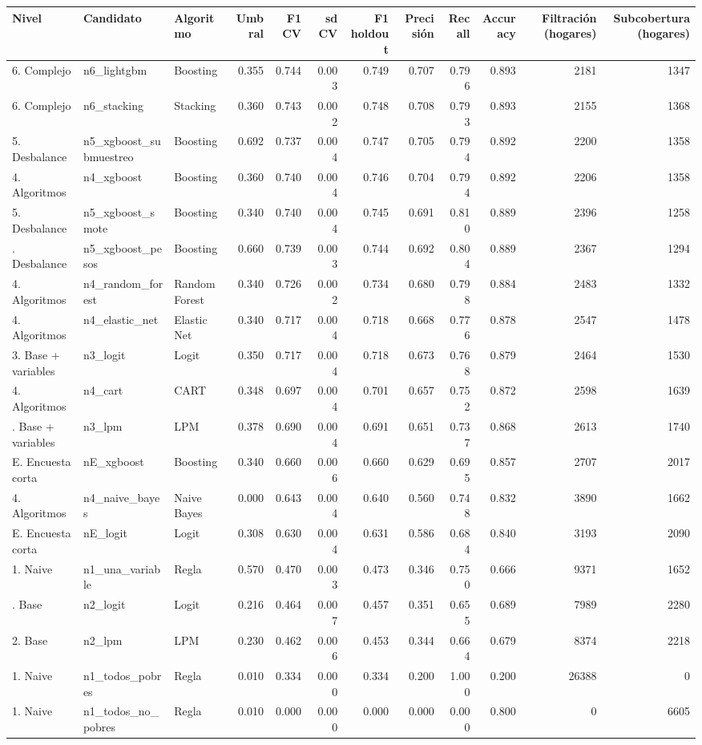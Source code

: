 
\begin{tabular}{lllrrrrrrrrr}
\toprule
Nivel & Candidato & Algoritmo & Umbral & F1 CV & sd CV & F1 holdout & Precisión & Recall & Accuracy & Filtración (hogares) & Subcobertura (hogares)\\
\midrule
6. Complejo & n6\_lightgbm & Boosting & 0.355 & 0.744 & 0.003 & 0.749 & 0.707 & 0.796 & 0.893 & 2181 & 1347\\
6. Complejo & n6\_stacking & Stacking & 0.360 & 0.743 & 0.002 & 0.748 & 0.708 & 0.793 & 0.893 & 2155 & 1368\\
5. Desbalance & n5\_xgboost\_submuestreo & Boosting & 0.692 & 0.737 & 0.004 & 0.747 & 0.705 & 0.794 & 0.892 & 2200 & 1358\\
4. Algoritmos & n4\_xgboost & Boosting & 0.360 & 0.740 & 0.004 & 0.746 & 0.704 & 0.794 & 0.892 & 2206 & 1358\\
5. Desbalance & n5\_xgboost\_smote & Boosting & 0.340 & 0.740 & 0.004 & 0.745 & 0.691 & 0.810 & 0.889 & 2396 & 1258\\
\addlinespace
5. Desbalance & n5\_xgboost\_pesos & Boosting & 0.660 & 0.739 & 0.003 & 0.744 & 0.692 & 0.804 & 0.889 & 2367 & 1294\\
4. Algoritmos & n4\_random\_forest & Random Forest & 0.340 & 0.726 & 0.002 & 0.734 & 0.680 & 0.798 & 0.884 & 2483 & 1332\\
4. Algoritmos & n4\_elastic\_net & Elastic Net & 0.340 & 0.717 & 0.004 & 0.718 & 0.668 & 0.776 & 0.878 & 2547 & 1478\\
3. Base + variables & n3\_logit & Logit & 0.350 & 0.717 & 0.004 & 0.718 & 0.673 & 0.768 & 0.879 & 2464 & 1530\\
4. Algoritmos & n4\_cart & CART & 0.348 & 0.697 & 0.004 & 0.701 & 0.657 & 0.752 & 0.872 & 2598 & 1639\\
\addlinespace
3. Base + variables & n3\_lpm & LPM & 0.378 & 0.690 & 0.004 & 0.691 & 0.651 & 0.737 & 0.868 & 2613 & 1740\\
E. Encuesta corta & nE\_xgboost & Boosting & 0.340 & 0.660 & 0.006 & 0.660 & 0.629 & 0.695 & 0.857 & 2707 & 2017\\
4. Algoritmos & n4\_naive\_bayes & Naive Bayes & 0.000 & 0.643 & 0.004 & 0.640 & 0.560 & 0.748 & 0.832 & 3890 & 1662\\
E. Encuesta corta & nE\_logit & Logit & 0.308 & 0.630 & 0.004 & 0.631 & 0.586 & 0.684 & 0.840 & 3193 & 2090\\
1. Naive & n1\_una\_variable & Regla & 0.570 & 0.470 & 0.003 & 0.473 & 0.346 & 0.750 & 0.666 & 9371 & 1652\\
\addlinespace
2. Base & n2\_logit & Logit & 0.216 & 0.464 & 0.007 & 0.457 & 0.351 & 0.655 & 0.689 & 7989 & 2280\\
2. Base & n2\_lpm & LPM & 0.230 & 0.462 & 0.006 & 0.453 & 0.344 & 0.664 & 0.679 & 8374 & 2218\\
1. Naive & n1\_todos\_pobres & Regla & 0.010 & 0.334 & 0.000 & 0.334 & 0.200 & 1.000 & 0.200 & 26388 & 0\\
1. Naive & n1\_todos\_no\_pobres & Regla & 0.010 & 0.000 & 0.000 & 0.000 & 0.000 & 0.000 & 0.800 & 0 & 6605\\
\bottomrule
\end{tabular}
